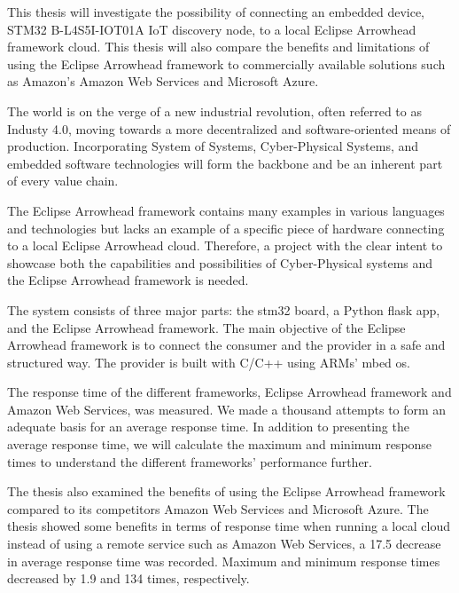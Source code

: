 This thesis will investigate the possibility of connecting an embedded device, STM32 B-L4S5I-IOT01A IoT discovery node, to a local Eclipse Arrowhead framework cloud.
This thesis will also compare the benefits and limitations of using the Eclipse Arrowhead framework to commercially available solutions such
as Amazon's Amazon Web Services and Microsoft Azure.

The world is on the verge of a new industrial revolution, often referred to as Industy 4.0, moving towards a more decentralized and software-oriented means of production.
Incorporating System of Systems, Cyber-Physical Systems, and embedded software technologies will form the backbone and be an inherent part of every value chain.

The Eclipse Arrowhead framework contains many examples in various languages and technologies but lacks an example of a specific piece of hardware connecting to a local Eclipse Arrowhead cloud.
Therefore, a project with the clear intent to showcase both the capabilities and possibilities of Cyber-Physical systems and the Eclipse Arrowhead framework is needed.

The system consists of three major parts: the stm32 board, a Python flask app, and the Eclipse Arrowhead framework.
The main objective of the Eclipse Arrowhead framework is to connect the consumer and the provider in a safe and structured way.
The provider is built with C/C++ using ARMs' mbed os. 

The response time of the different frameworks, Eclipse Arrowhead framework and Amazon Web Services, was measured.
We made a thousand attempts to form an adequate basis for an average response time. 
In addition to presenting the average response time, we will calculate the maximum and minimum response times to understand the different frameworks' performance further. 

The thesis also examined the benefits of using the Eclipse Arrowhead framework compared to its competitors Amazon Web Services and Microsoft Azure.
The thesis showed some benefits in terms of response time when running a local cloud instead of using a remote service such as Amazon Web Services, a 17.5 decrease in average response time was recorded.
Maximum and minimum response times decreased by 1.9 and 134 times, respectively.  